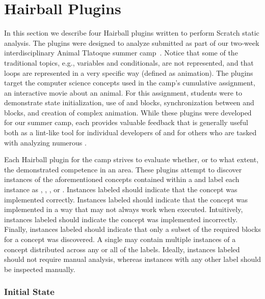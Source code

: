 \section{Hairball Plugins} 
In this section we describe four Hairball plugins written to perform Scratch
static analysis.  The plugins were designed to analyze  submitted
as part of our two-week interdisciplinary Animal Tlatoque summer
camp~\cite{Franklin:2013:SBO}.  Notice that some of the traditional topics,
e.g., variables and conditionals, are not represented, and that loops are
represented in a very specific way (defined as animation). The plugins target
the computer science concepts used in the camp's cumulative assignment, an
interactive movie about an animal. For this assignment, students were to
demonstrate state initialization, use of \broadcast{} and \receive{} blocks,
synchronization between \say{} and \playsound{} blocks, and creation of complex
animation. While these plugins were developed for our summer camp, each
provides valuable feedback that is generally useful both as a lint-like tool
for individual developers of  and for others who are tasked with
analyzing numerous .

Each Hairball plugin for the camp strives to evaluate whether, or to what
extent, the \sprogram{} demonstrated competence in an area. These plugins
attempt to discover instances of the aforementioned concepts contained within a
\sprogram{} and label each instance as \correct{}, \semincor{}, \incor{}, or
\incom{}. Instances labeled \correct{} should indicate that the concept was
implemented correctly. Instances labeled \semincor{} should indicate that the
concept was implemented in a way that may not always work when
executed. Intuitively, instances labeled \incor{} should indicate the concept
was implemented incorrectly. Finally, instances labeled \incom{} should
indicate that only a subset of the required blocks for a concept was
discovered. A single \sprogram{} may contain multiple instances of a concept
distributed across any or all of the labels. Ideally, instances labeled
\correct{} should not require manual analysis, whereas instances with any other
label should be inspected manually.


\subsubsection{Initial State}

